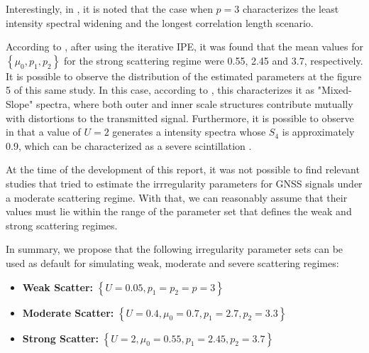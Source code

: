 Interestingly, in \cite[Section 4.1]{Carrano2016OverviewOfTwoComponentPowerLaw}, it is noted that the case when $p = 3$ characterizes the least intensity spectral widening and the longest correlation length scenario.

According to \cite{xuTwoparameterMultifrequencyGPS2020}, after using the iterative IPE, it was found that the mean values for $\left\{ \mu_0, p_1, p_2 \right\}$ for the strong scattering regime were 0.55, 2.45 and 3.7, respectively. It is possible to observe the distribution of the estimated parameters at the figure 5 of this same study. In this case, according to \cite[section 3.2.3]{Carrano2016OverviewOfTwoComponentPowerLaw}, this characterizes it as "Mixed-Slope" spectra, where both outer and inner scale structures contribute mutually with distortions to the transmitted signal. Furthermore, it is possible to observe in \cite[Figure 6]{xuTwoparameterMultifrequencyGPS2020} that a value of $U=2$ generates a intensity spectra whose $S_4$ is approximately 0.9, which can be characterized as a severe scintillation \cite[Section III, subsection A]{humphreysDatadrivenTestbedEvaluating2010}.

At the time of the development of this report, it was not possible to find relevant studies that tried to estimate the irrregularity parameters for GNSS signals under a moderate scattering regime. With that, we can reasonably assume that their values must lie within the range of the parameter set that defines the weak and strong scattering regimes.

In summary, we propose that the following irregularity parameter sets can be used as default for simulating weak, moderate and severe scattering regimes:
\begin{itemize}
    \item \textbf{Weak Scatter:} $\left\{ U = 0.05, p_1 = p_2 = p = 3  \right\}$
    \item \textbf{Moderate Scatter:} $\left\{ U = 0.4, \mu_0 = 0.7, p_1 = 2.7, p_2 = 3.3 \right\}$
    \item \textbf{Strong Scatter:} $\left\{ U = 2, \mu_0 = 0.55, p_1 = 2.45, p_2 = 3.7 \right\}$
\end{itemize}